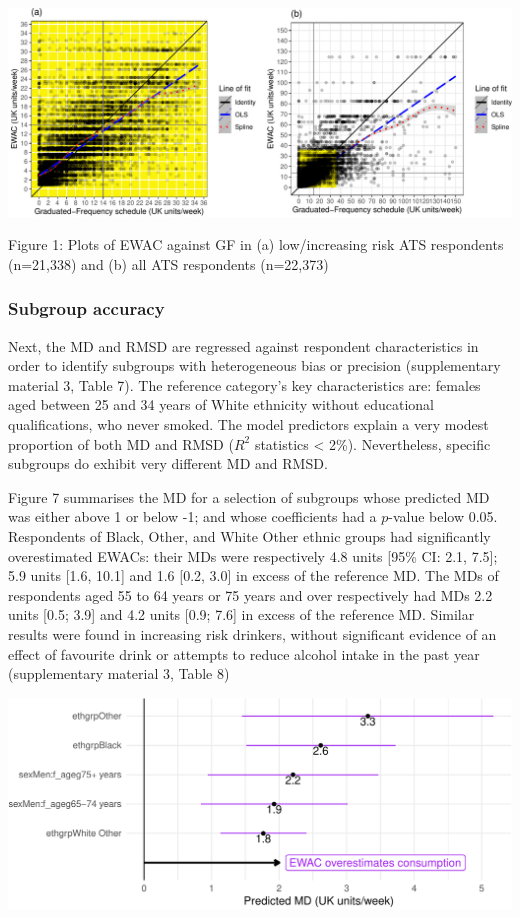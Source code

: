 \documentclass[]{article}
\begin{document}
\includegraphics{analysis_files/figure-latex/unnamed-chunk-2-1.pdf}

Figure 1: Plots of EWAC against GF in (a) low/increasing risk ATS
respondents (n=21,338) and (b) all ATS respondents (n=22,373)

\hypertarget{subgroup-accuracy}{%
\subsubsection{Subgroup accuracy}\label{subgroup-accuracy}}

Next, the MD and RMSD are regressed against respondent characteristics
in order to identify subgroups with heterogeneous bias or precision
(supplementary material 3, Table 7). The reference category's key
characteristics are: females aged between 25 and 34 years of White
ethnicity without educational qualifications, who never smoked. The
model predictors explain a very modest proportion of both MD and RMSD
(\(R^2\) statistics \textless{} 2\%). Nevertheless, specific subgroups
do exhibit very different MD and RMSD.

Figure 7 summarises the MD for a selection of subgroups whose predicted
MD was either above 1 or below -1; and whose coefficients had a
\(p\)-value below 0.05. Respondents of Black, Other, and White Other
ethnic groups had significantly overestimated EWACs: their MDs were
respectively 4.8 units {[}95\% CI: 2.1, 7.5{]}; 5.9 units {[}1.6,
10.1{]} and 1.6 {[}0.2, 3.0{]} in excess of the reference MD. The MDs of
respondents aged 55 to 64 years or 75 years and over respectively had
MDs 2.2 units {[}0.5; 3.9{]} and 4.2 units {[}0.9; 7.6{]} in excess of
the reference MD. Similar results were found in increasing risk
drinkers, without significant evidence of an effect of favourite drink
or attempts to reduce alcohol intake in the past year (supplementary
material 3, Table 8)

\includegraphics{analysis_files/figure-latex/ewac_subgroup_bias-1.pdf}
\end{document}

